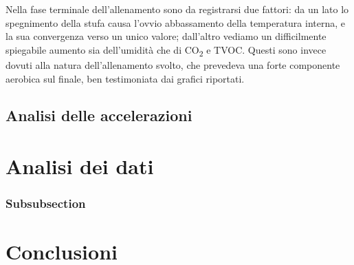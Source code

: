 \documentclass[fleqn,10pt]{SelfArx} %
\begin{document}
Nella fase terminale dell'allenamento sono da registrarsi due fattori: da un lato lo spegnimento della 
stufa causa l'ovvio abbassamento della temperatura interna, e la sua convergenza verso un unico valore; 
dall'altro vediamo un difficilmente spiegabile aumento sia dell'umidità che di CO\textsubscript{2} e TVOC.
Questi sono invece dovuti alla natura dell'allenamento svolto, che prevedeva una forte componente aerobica 
sul finale, ben testimoniata dai grafici riportati.\\

\subsection{Analisi delle accelerazioni}

\section{Analisi dei dati}



\subsubsection{Subsubsection}

\section{Conclusioni}





\end{document}
